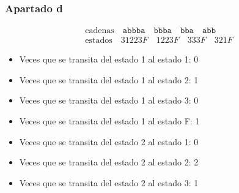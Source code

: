 \subsubsection{Apartado d}

\[
\begin{array}{l}
\text{cadenas} \quad \texttt{abbba} \quad \texttt{bbba} \quad \texttt{bba} \quad \texttt{abb} \\
\text{estados} \quad 31223F \quad 1223F \quad 333F \quad 321F
\end{array}
\]

\begin{itemize}
    \item Veces que se transita del estado 1 al estado 1: 0
    \item Veces que se transita del estado 1 al estado 2: 1
    \item Veces que se transita del estado 1 al estado 3: 0
    \item Veces que se transita del estado 1 al estado F: 1
    \item Veces que se transita del estado 2 al estado 1: 0
    \item Veces que se transita del estado 2 al estado 2: 2
    \item Veces que se transita del estado 2 al estado 3: 1
\end{itemize}